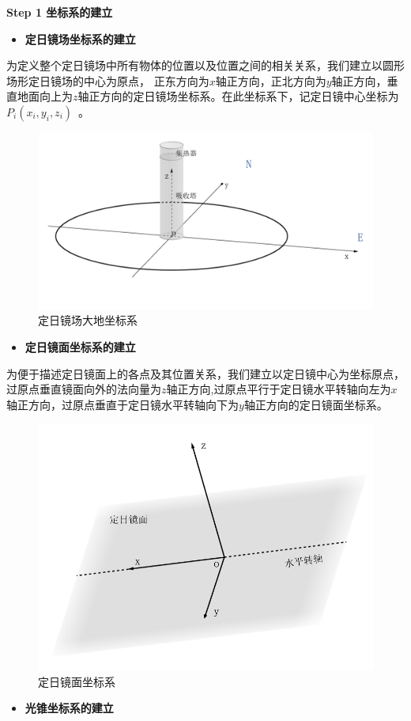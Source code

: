 \documentclass[../main.tex]{subfiles}
\begin{document}
  \noindent \textbf{Step 1 坐标系的建立}

  \begin{itemize}
  \item \textbf{定日镜场坐标系的建立}
  \end{itemize}

  \par 为定义整个定日镜场中所有物体的位置以及位置之间的相关关系，我们建立以圆形场形定日镜场的中心为原点，  
正东方向为$x$轴正方向，正北方向为$y$轴正方向，垂直地面向上为$z$轴正方向的定日镜场坐标系。在此坐标系下，记定日镜中心坐标为 \( P_i(x_i, y_i, z_i) \) 。 
  \begin{figure}[H]
    \centering
    \includegraphics[width=.6\textwidth]{1}
    \caption{定日镜场大地坐标系}
    \label{1.1}
\end{figure}
    \begin{itemize}
  \item \textbf{定日镜面坐标系的建立}
  \end{itemize}
  \par 为便于描述定日镜面上的各点及其位置关系，我们建立以定日镜中心为坐标原点，过原点垂直镜面向外的法向量为$z$轴正方向,过原点平行于定日镜水平转轴向左为$x$轴正方向，过原点垂直于定日镜水平转轴向下为$y$轴正方向的定日镜面坐标系。
  \begin{figure}[H]
    \centering
    \includegraphics[width=.6\textwidth]{2}
    \caption{定日镜面坐标系}
    \label{1.2}
\end{figure}
    \begin{itemize}
  \item \textbf{光锥坐标系的建立}
  \end{itemize}
\end{document}

